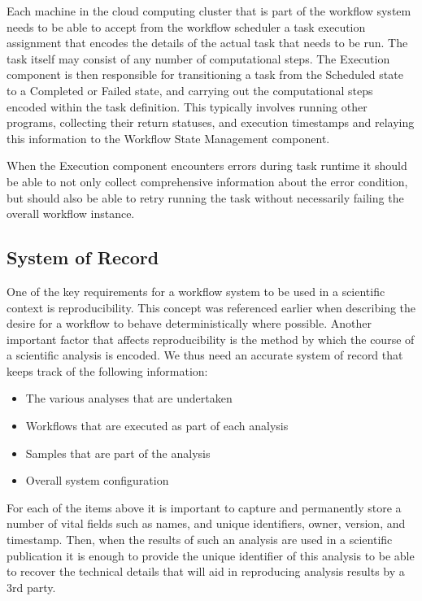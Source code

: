 Each machine in the cloud computing cluster that is part of the workflow system needs to be able to accept from the workflow scheduler a task execution assignment that encodes the details of the actual task that needs to be run. The task itself may consist of any number of computational steps. The Execution component is then responsible for transitioning a task from the Scheduled state to a Completed or Failed state, and carrying out the computational steps encoded within the task definition. This typically involves running other programs, collecting their return statuses, and execution timestamps and relaying this information to the Workflow State Management component.

When the Execution component encounters errors during task runtime it should be able to not only collect comprehensive information about the error condition, but should also be able to retry running the task without necessarily failing the overall workflow instance.
   
\subsection {System of Record} \label{sec:system_of_record}

One of the key requirements for a workflow system to be used in a scientific context is reproducibility. This concept was referenced earlier when describing the desire for a workflow to behave deterministically where possible. Another important factor that affects reproducibility is the method by which the course of a scientific analysis is encoded. We thus need an accurate system of record that keeps track of the following information:

\begin{itemize}
\item The various analyses that are undertaken
\item Workflows that are executed as part of each analysis
\item Samples that are part of the analysis
\item Overall system configuration
\end{itemize}

For each of the items above it is important to capture and permanently store a number of vital fields such as names, and unique identifiers, owner, version, and timestamp. Then, when the results of such an analysis are used in a scientific publication it is enough to provide the unique identifier of this analysis to be able to recover the technical details that will aid in reproducing analysis results by a 3rd party.

